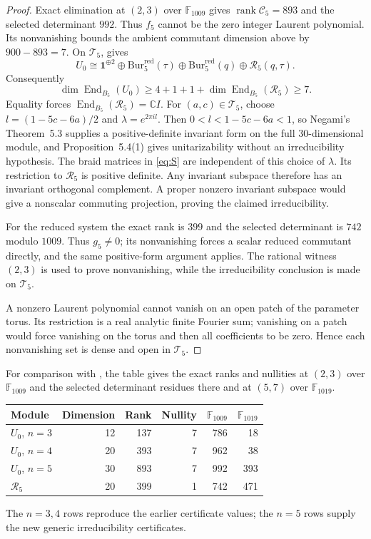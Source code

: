 \documentclass[11pt,a4paper]{article}
\newcommand{\C}{\mathbb C}
\newcommand{\F}{\mathbb F}
\newcommand{\Rcal}{\mathcal R}
\newcommand{\Tcal}{\mathcal T}
\newcommand{\End}{\operatorname{End}}
\newcommand{\rank}{\operatorname{rank}}
\newcommand{\Bur}{\mathrm{Bur}^{\mathrm{red}}}
\begin{document}
\begin{proof}
Exact elimination at $(2,3)$ over $\F_{1009}$ gives
$\rank\mathcal C_5=893$ and the selected determinant $992$.
Thus $f_5$ cannot be the zero integer Laurent polynomial.
Its nonvanishing bounds the ambient commutant dimension above by
$900-893=7$.
On $\Tcal_5$, \cite[Proposition~5.7]{Negami} gives
\begin{equation}\label{eq:decomp}
 U_0\cong\mathbf1^{\oplus2}\oplus\Bur_5(\tau)
       \oplus\Bur_5(q)\oplus\Rcal_5(q,\tau).
\end{equation}
Consequently
\[
 \dim\End_{B_5}(U_0)\ge4+1+1+\dim\End_{B_5}(\Rcal_5)\ge7.
\]
Equality forces $\End_{B_5}(\Rcal_5)=\C I$.
For $(a,c)\in\Tcal_5$, choose $l=(1-5c-6a)/2$ and
$\lambda=e^{2\pi i l}$. Then $0<l<1-5c-6a<1$, so Negami's Theorem~5.3 supplies a
positive-definite invariant form on the full $30$-dimensional module,
and Proposition~5.4(1) gives unitarizability without an irreducibility
hypothesis. The braid matrices in \eqref{eq:S} are independent of this
choice of $\lambda$.
Its restriction to $\Rcal_5$ is positive definite. Any invariant
subspace therefore has an invariant orthogonal complement. A proper
nonzero invariant subspace would give a nonscalar commuting projection,
proving the claimed irreducibility.

For the reduced system the exact rank is $399$ and the selected
determinant is $742$ modulo $1009$. Thus $g_5\ne0$; its nonvanishing
forces a scalar reduced commutant directly, and the same positive-form
argument applies. The rational witness $(2,3)$ is used to prove
nonvanishing, while the irreducibility conclusion is made on $\Tcal_5$.

A nonzero Laurent polynomial cannot vanish on an open patch of the
parameter torus. Its restriction is a real analytic finite Fourier
sum; vanishing on a patch would force vanishing on the torus and then
all coefficients to be zero. Hence each nonvanishing set is dense and
open in $\Tcal_5$.
\end{proof}

For comparison with \cite[Proposition~5.10]{Negami}, the table gives
the exact ranks and nullities at $(2,3)$ over $\F_{1009}$ and the
selected determinant residues there and at $(5,7)$ over $\F_{1019}$.
\begin{center}
\begin{tabular}{@{}lrrrrr@{}}
\toprule
Module & Dimension & Rank & Nullity & $\F_{1009}$ & $\F_{1019}$\\
\midrule
$U_0$, $n=3$ & 12 & 137 & 7 & 786 & 18\\
$U_0$, $n=4$ & 20 & 393 & 7 & 962 & 38\\
$U_0$, $n=5$ & 30 & 893 & 7 & 992 & 393\\
$\Rcal_5$ & 20 & 399 & 1 & 742 & 471\\
\bottomrule
\end{tabular}
\end{center}
The $n=3,4$ rows reproduce the earlier certificate values; the $n=5$
rows supply the new generic irreducibility certificates.
\end{document}

